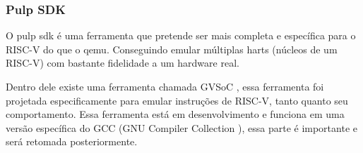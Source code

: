 \subsubsection{Pulp SDK}

O pulp sdk \cite{PulpSDKRepositorio} é uma ferramenta que pretende ser mais completa e específica para o RISC-V do que o qemu. 
Conseguindo emular múltiplas harts (núcleos de um RISC-V) com bastante fidelidade a um hardware real.

Dentro dele existe uma ferramenta chamada GVSoC \cite{9643828}, essa ferramenta foi projetada especificamente para emular 
instruções de RISC-V, tanto quanto seu comportamento. Essa ferramenta está em desenvolvimento e funciona em uma versão específica do 
GCC (GNU Compiler Collection \cite{GCC}), essa parte é importante e será retomada posteriormente.
